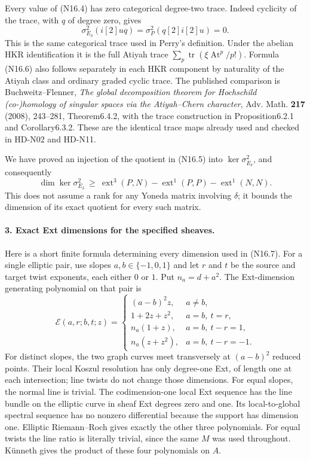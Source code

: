 Every value of (N16.4) has zero categorical degree-two trace.
Indeed cyclicity of the trace, with $q$ of degree zero, gives
\begin{equation}
 \sigma^2_{E_\delta}(i[2]uq)
       =\sigma^2_P(q[2]i[2]u)=0.                     \tag{N16.6}
\end{equation}
This is the same categorical trace used in Perry's definition.
Under the abelian HKR identification it is the full Atiyah trace
$\sum_p\operatorname{tr}(\xi\operatorname{At}^p/p!)$.
Formula (N16.6) also follows separately in each HKR component by
naturality of the Atiyah class and ordinary graded cyclic trace.
The published comparison is Buchweitz--Flenner,
\emph{The global decomposition theorem for Hochschild (co-)homology
of singular spaces via the Atiyah--Chern character},
Adv. Math. \textbf{217} (2008), 243--281,
Theorem6.4.2, with the trace construction in Proposition6.2.1 and
Corollary6.3.2. These are the identical trace maps already used
and checked in HD-N02 and HD-N11.

We have proved an injection of the quotient in (N16.5) into
$\ker\sigma^2_{E_\delta}$, and consequently
\begin{equation}
 \dim\ker\sigma^2_{E_\delta}\ \geq\
  \operatorname{ext}^3(P,N)
  -\operatorname{ext}^1(P,P)-\operatorname{ext}^1(N,N). \tag{N16.7}
\end{equation}
This does not assume a rank for any Yoneda matrix involving
$\delta$; it bounds the dimension of its exact quotient for
every such matrix.

\paragraph{3. Exact Ext dimensions for the specified sheaves.}
Here is a short finite formula determining every dimension used
in (N16.7). For a single elliptic pair, use slopes
$a,b\in\{-1,0,1\}$ and let $r$ and $t$ be the source and target
twist exponents, each either $0$ or $1$. Put $n_a=d+a^2$.
The Ext-dimension generating polynomial on that pair is
\begin{equation}
 \mathcal E(a,r;b,t;z)=
 \begin{cases}
   (a-b)^2z,&a\ne b,\\
   1+2z+z^2,&a=b,\ t=r,\\
   n_a(1+z),&a=b,\ t-r=1,\\
   n_a(z+z^2),&a=b,\ t-r=-1.
 \end{cases}                                        \tag{N16.8}
\end{equation}
For distinct slopes, the two graph curves meet transversely at
$(a-b)^2$ reduced points. Their local Koszul resolution has only
degree-one Ext, of length one at each intersection; line twists
do not change those dimensions. For equal slopes, the normal
line is trivial. The codimension-one local Ext sequence has
the line bundle on the elliptic curve in sheaf Ext degrees
zero and one. Its local-to-global spectral sequence has no
nonzero differential because the support has dimension one.
Elliptic Riemann--Roch gives exactly the other three polynomials.
For equal twists the line ratio is literally trivial, since the
same $M$ was used throughout. K\"unneth gives the product of
these four polynomials on $A$.

